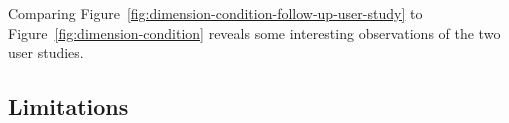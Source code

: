 Comparing Figure~\ref{fig:dimension-condition-follow-up-user-study} to Figure~\ref{fig:dimension-condition} reveals some interesting observations of the two user studies.

\more









\subsection{Limitations}


